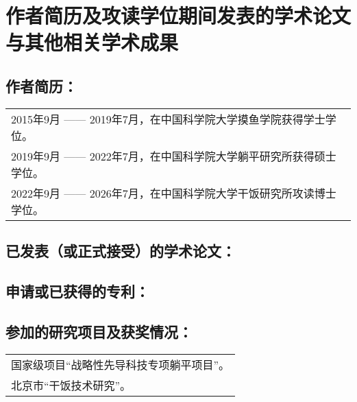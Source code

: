 \chapter{作者简历及攻读学位期间发表的学术论文与其他相关学术成果}

\section*{\textbf{作者简历：}}

\noindent\begin{tabularx}{\textwidth}{@{}X@{}}
2015年9月 ------ 2019年7月，在中国科学院大学摸鱼学院获得学士学位。 \\
2019年9月 ------ 2022年7月，在中国科学院大学躺平研究所获得硕士学位。\\
2022年9月 ------ 2026年7月，在中国科学院大学干饭研究所攻读博士学位。
\end{tabularx}

\begin{refsection}
    \nocite{*} %

    \section*{已发表（或正式接受）的学术论文：}


    \printbibliography[keyword=mypapers, heading=none, resetnumbers=true]

    \section*{申请或已获得的专利：}


    \printbibliography[keyword=mypatents, heading=none, resetnumbers=true]
\end{refsection}

\section*{参加的研究项目及获奖情况：}

\noindent\begin{tabularx}{\textwidth}{@{}X@{}}
国家级项目“战略性先导科技专项躺平项目”。 \\
北京市“干饭技术研究”。
\end{tabularx}
